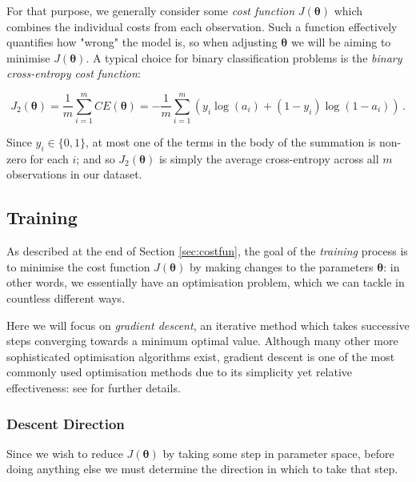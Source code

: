 \documentclass{article}[11pt]
\begin{document}
        For that purpose, we generally consider some \textit{cost function} $J(\boldsymbol{\theta})$ which combines the individual costs from each observation. Such a function effectively quantifies how "wrong" the model is, so when adjusting $\boldsymbol{\theta}$ we will be aiming to minimise $J(\boldsymbol{\theta})$. A typical choice for binary classification problems is the \textit{binary cross-entropy cost function}:
        
        $$
        J_2(\boldsymbol{\theta}) = \frac{1}{m} \sum_{i=1}^{m} CE(\boldsymbol{\theta}) = - \frac{1}{m} \sum_{i=1}^{m} \left( y_i \log(a_i) + (1 - y_i) \log(1 - a_i) \right) \,.
        $$
        
        Since $y_i \in \{0, 1\}$, at most one of the terms in the body of the summation is non-zero for each $i$; and so $J_2(\boldsymbol{\theta})$ is simply the average cross-entropy across all $m$ observations in our dataset.
    
    

    \subsection{Training} \label{sec:gradient_descent}
        
        As described at the end of Section \ref{sec:costfun}, the goal of the \textit{training} process is to minimise the cost function $J(\boldsymbol{\theta})$ by making changes to the parameters $\boldsymbol{\theta}$: in other words, we essentially have an optimisation problem, which we can tackle in countless different ways.
        
        Here we will focus on \textit{gradient descent}, an iterative method which takes successive steps converging towards a minimum optimal value. Although many other more sophisticated optimisation algorithms exist, gradient descent is one of the most commonly used optimisation methods due to its simplicity yet relative effectiveness: see \cite{lecun_backprop} for further details.
        
        
        
        \subsubsection{Descent Direction}
            
            Since we wish to reduce $J(\boldsymbol{\theta})$ by taking some step in parameter space, before doing anything else we must determine the direction in which to take that step.
            
\end{document}
